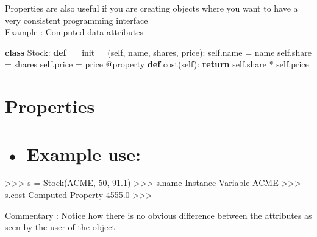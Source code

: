 \documentclass[
  letterpaper,
  DIV=11,
  numbers=noendperiod]{scrreprt}
\newenvironment{Shaded}{\begin{snugshade}}{\end{snugshade}}
\newcommand{\ControlFlowTok}[1]{\textcolor[rgb]{0.00,0.23,0.31}{\textbf{#1}}}
\newcommand{\FunctionTok}[1]{\textcolor[rgb]{0.28,0.35,0.67}{#1}}
\newcommand{\KeywordTok}[1]{\textcolor[rgb]{0.00,0.23,0.31}{\textbf{#1}}}
\newcommand{\NormalTok}[1]{\textcolor[rgb]{0.00,0.23,0.31}{#1}}
\newcommand{\OperatorTok}[1]{\textcolor[rgb]{0.37,0.37,0.37}{#1}}
\newcommand{\VariableTok}[1]{\textcolor[rgb]{0.07,0.07,0.07}{#1}}
\begin{document}
Properties are also useful if you are creating objects where you want to
have a very consistent programming interface\\
Example : Computed data attributes

\begin{Shaded}
\begin{Highlighting}[]
\KeywordTok{class}\NormalTok{ Stock: }\KeywordTok{def} \FunctionTok{\_\_init\_\_}\NormalTok{(}\VariableTok{self}\NormalTok{, name, shares, price): }\VariableTok{self}\NormalTok{.name }\OperatorTok{=}\NormalTok{ name }\VariableTok{self}\NormalTok{.share }\OperatorTok{=}\NormalTok{ shares }\VariableTok{self}\NormalTok{.price }\OperatorTok{=}\NormalTok{ price }\OperatorTok{@}\NormalTok{property }\KeywordTok{def}\NormalTok{ cost(}\VariableTok{self}\NormalTok{): }\ControlFlowTok{return} \VariableTok{self}\NormalTok{.share }\OperatorTok{*} \VariableTok{self}\NormalTok{.price }
\end{Highlighting}
\end{Shaded}


\chapter{Properties}\label{properties-4}


\chapter{• Example use:}\label{example-use}

\begin{Shaded}
\begin{Highlighting}[]
\NormalTok{\textgreater{}\textgreater{}\textgreater{} s = Stock(\textquotesingle{}ACME\textquotesingle{}, 50, 91.1)  }
\NormalTok{\textgreater{}\textgreater{}\textgreater{} s.name Instance Variable  }
\NormalTok{\textquotesingle{}ACME\textquotesingle{}  }
\NormalTok{\textgreater{}\textgreater{}\textgreater{} s.cost Computed Property  }
\NormalTok{4555.0  }
\NormalTok{\textgreater{}\textgreater{}\textgreater{} }
\end{Highlighting}
\end{Shaded}

Commentary : Notice how there is no obvious difference between the
attributes as seen by the user of the object

\end{document}

